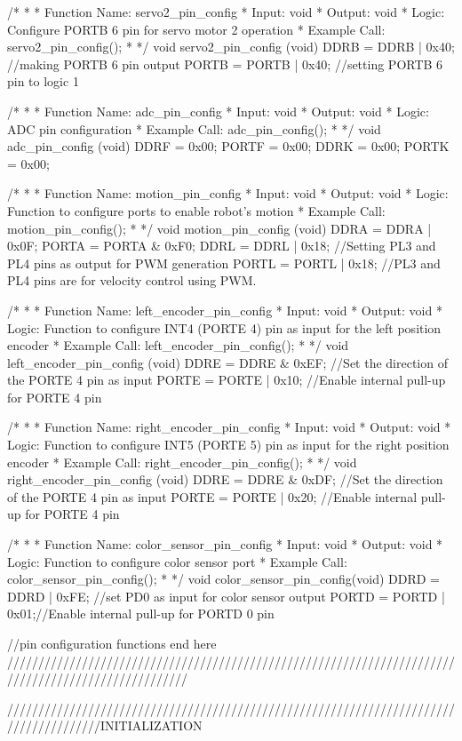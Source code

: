 /*
*
* Function Name: servo2_pin_config
* Input: void
* Output: void
* Logic: Configure PORTB 6 pin for servo motor 2 operation
* Example Call: servo2_pin_config();
*
*/
void servo2_pin_config (void)
{
	DDRB  = DDRB | 0x40;  //making PORTB 6 pin output
	PORTB = PORTB | 0x40; //setting PORTB 6 pin to logic 1
}

/*
*
* Function Name: adc_pin_config
* Input: void
* Output: void
* Logic: ADC pin configuration
* Example Call: adc_pin_config();
*
*/
void adc_pin_config (void)
{
	DDRF = 0x00;
	PORTF = 0x00;
	DDRK = 0x00;
	PORTK = 0x00;
}

/*
*
* Function Name: motion_pin_config
* Input: void
* Output: void
* Logic: Function to configure ports to enable robot's motion
* Example Call: motion_pin_config();
*
*/
void motion_pin_config (void)
{
	DDRA = DDRA | 0x0F;
	PORTA = PORTA & 0xF0;
	DDRL = DDRL | 0x18;   //Setting PL3 and PL4 pins as output for PWM generation
	PORTL = PORTL | 0x18; //PL3 and PL4 pins are for velocity control using PWM.
}

/*
*
* Function Name: left_encoder_pin_config
* Input: void
* Output: void
* Logic: Function to configure INT4 (PORTE 4) pin as input for the left position encoder
* Example Call: left_encoder_pin_config();
*
*/
void left_encoder_pin_config (void)
{
	DDRE  = DDRE & 0xEF;  //Set the direction of the PORTE 4 pin as input
	PORTE = PORTE | 0x10; //Enable internal pull-up for PORTE 4 pin
}

/*
*
* Function Name: right_encoder_pin_config
* Input: void
* Output: void
* Logic: Function to configure INT5 (PORTE 5) pin as input for the right position encoder
* Example Call: right_encoder_pin_config();
*
*/
void right_encoder_pin_config (void)
{
	DDRE  = DDRE & 0xDF;  //Set the direction of the PORTE 4 pin as input
	PORTE = PORTE | 0x20; //Enable internal pull-up for PORTE 4 pin
}

/*
*
* Function Name: color_sensor_pin_config
* Input: void
* Output: void
* Logic: Function to configure color sensor port
* Example Call: color_sensor_pin_config();
*
*/
void color_sensor_pin_config(void)
{
	DDRD  = DDRD | 0xFE; //set PD0 as input for color sensor output
	PORTD = PORTD | 0x01;//Enable internal pull-up for PORTD 0 pin
}

//pin configuration functions end here
/////////////////////////////////////////////////////////////////////////////////////////////////////


///////////////////////////////////////////////////////////////////////////////////////INITIALIZATION

